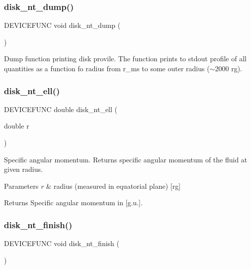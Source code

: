 \subsubsection{\texorpdfstring{disk\+\_\+nt\+\_\+dump()}{disk\_nt\_dump()}}
{\footnotesize\ttfamily D\+E\+V\+I\+C\+E\+F\+U\+NC void disk\+\_\+nt\+\_\+dump (\begin{DoxyParamCaption}{ }\end{DoxyParamCaption})}

Dump function printing disk provile. The function prints to stdout profile of all quantities as a function fo radius from r\+\_\+ms to some outer radius ($\sim$2000 rg). \mbox{\label{sim5disk-nt_8c_a5334fc211402dd26b97d0c45f905b48e}} 
\subsubsection{\texorpdfstring{disk\+\_\+nt\+\_\+ell()}{disk\_nt\_ell()}}
{\footnotesize\ttfamily D\+E\+V\+I\+C\+E\+F\+U\+NC double disk\+\_\+nt\+\_\+ell (\begin{DoxyParamCaption}\item[{double}]{r }\end{DoxyParamCaption})}

Specific angular momentum. Returns specific angular momentum of the fluid at given radius.


\begin{DoxyParams}{Parameters}
{\em r} & radius (measured in equatorial plane) \mbox{[}rg\mbox{]}\\
\hline
\end{DoxyParams}
\begin{DoxyReturn}{Returns}
Specific angular momentum in \mbox{[}g.\+u.\mbox{]}. 
\end{DoxyReturn}
\mbox{\label{sim5disk-nt_8c_a27159e5846914b6f75ed1a4bbad03cea}} 
\subsubsection{\texorpdfstring{disk\+\_\+nt\+\_\+finish()}{disk\_nt\_finish()}}
{\footnotesize\ttfamily D\+E\+V\+I\+C\+E\+F\+U\+NC void disk\+\_\+nt\+\_\+finish (\begin{DoxyParamCaption}{ }\end{DoxyParamCaption})}

